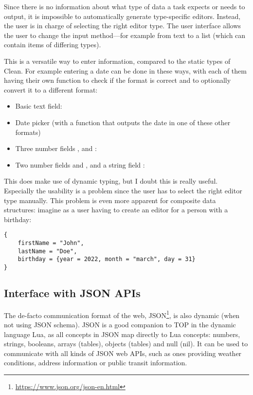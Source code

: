 Since there is no information about what type of data a task expects or needs to output, it is impossible to automatically generate type-specific editors. Instead, the user is in charge of selecting the right editor type. The user interface allows the user to change the input method---for example from text to a list (which can contain items of differing types).

This is a versatile way to enter information, compared to the static types of Clean. For example entering a date can be done in these ways, with each of them having their own function to check if the format is correct and to optionally convert it to a different format:
\begin{itemize}
    \item Basic text field: 
    \item Date picker (with a function that outputs the date in one of these other formats)
    \item Three number fields ,  and :\\
    \item Two number fields  and , and a string field :\\
\end{itemize}

This does make use of dynamic typing, but I doubt this is really useful. Especially the usability is a problem since the user has to select the right editor type manually. This problem is even more apparent for composite data structures: imagine as a user having to create an editor for a person with a birthday:

\medskip\noindent
\begin{verbatim}
{
    firstName = "John",
    lastName = "Doe",
    birthday = {year = 2022, month = "march", day = 31}
}
\end{verbatim}

\subsection{Interface with JSON APIs}\label{section-types-json}
The de-facto communication format of the web, JSON\footnote{\url{https://www.json.org/json-en.html}}, is also dynamic (when not using JSON schema). JSON is a good companion to TOP in the dynamic language Lua, as all concepts in JSON map directly to Lua concepts: numbers, strings, booleans, arrays (tables), objects (tables) and null (nil). It can be used to communicate with all kinds of JSON web APIs, such as ones providing weather conditions, address information or public transit information.

